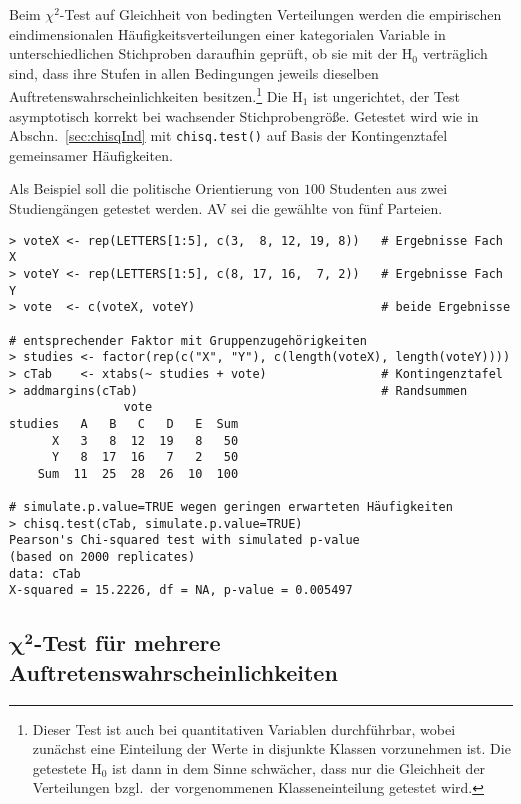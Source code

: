 Beim $\chi^{2}$-Test auf Gleichheit von bedingten Verteilungen werden die empirischen eindimensionalen Häufigkeitsverteilungen einer kategorialen Variable in unterschiedlichen Stichproben daraufhin geprüft, ob sie mit der $\text{H}_{0}$ verträglich sind, dass ihre Stufen in allen Bedingungen jeweils dieselben Auftretenswahrscheinlichkeiten besitzen.\footnote{Dieser Test ist auch bei quantitativen Variablen durchführbar, wobei zunächst eine Einteilung der Werte in disjunkte Klassen vorzunehmen ist. Die getestete $\text{H}_{0}$ ist dann in dem Sinne schwächer, dass nur die Gleichheit der Verteilungen bzgl.\ der vorgenommenen Klasseneinteilung getestet wird.} Die $\text{H}_{1}$ ist ungerichtet, der Test asymptotisch korrekt bei wachsender Stichprobengröße. Getestet wird wie in Abschn.\ \ref{sec:chisqInd} mit \lstinline!chisq.test()! auf Basis der Kontingenztafel gemeinsamer Häufigkeiten.

Als Beispiel soll die politische Orientierung von $100$ Studenten aus zwei Studiengängen getestet werden. AV sei die gewählte von fünf Parteien.
\begin{lstlisting}
> voteX <- rep(LETTERS[1:5], c(3,  8, 12, 19, 8))   # Ergebnisse Fach X
> voteY <- rep(LETTERS[1:5], c(8, 17, 16,  7, 2))   # Ergebnisse Fach Y
> vote  <- c(voteX, voteY)                          # beide Ergebnisse

# entsprechender Faktor mit Gruppenzugehörigkeiten
> studies <- factor(rep(c("X", "Y"), c(length(voteX), length(voteY))))
> cTab    <- xtabs(~ studies + vote)                # Kontingenztafel
> addmargins(cTab)                                  # Randsummen
                vote
studies   A   B   C   D   E  Sum
      X   3   8  12  19   8   50
      Y   8  17  16   7   2   50
    Sum  11  25  28  26  10  100

# simulate.p.value=TRUE wegen geringen erwarteten Häufigkeiten
> chisq.test(cTab, simulate.p.value=TRUE)
Pearson's Chi-squared test with simulated p-value
(based on 2000 replicates)
data: cTab
X-squared = 15.2226, df = NA, p-value = 0.005497
\end{lstlisting}

\subsection[\texorpdfstring{$\chi^{2}$}{chi2}-Test für mehrere Auftretenswahrscheinlichkeiten]{$\bm{\chi^{2}}$-Test für mehrere Auftretenswahrscheinlichkeiten}
\label{sec:propTest}

